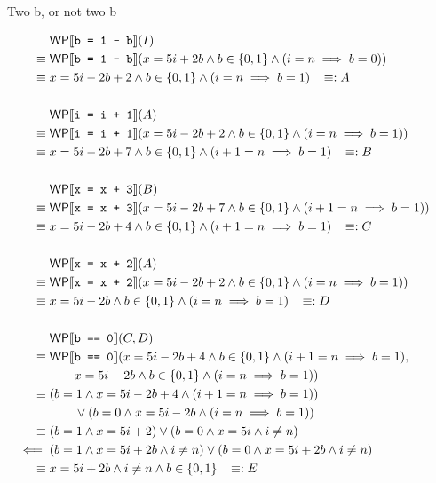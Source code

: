 \documentclass[
  english
]{tumteaching}
\begin{document}
\begin{assignment}[L]{Two b, or not two b}
\begin{solution}
		\begin{align*}
			&\;\WP{b = 1 - b}(I)\\
			\equiv&\;\WP{b = 1 - b}(x = 5i + 2b \land b \in \{ 0, 1 \} \land (i = n \implies b = 0))\\
			\equiv&\;x = 5i -2b + 2 \land b \in \{ 0, 1 \} \land (i = n \implies b = 1) \;\;\; \equivdef A\\
			&&\\
			&\;\WP{i = i + 1}(A)\\
			\equiv&\;\WP{i = i + 1}(x = 5i - 2b + 2 \land b \in \{ 0, 1 \} \land (i = n \implies b = 1))\\
			\equiv&\;x = 5i -2b + 7 \land b \in \{ 0, 1 \} \land (i + 1 = n \implies b = 1) \;\;\; \equivdef B\\
			&&\\
			&\;\WP{x = x + 3}(B)\\
			\equiv&\;\WP{x = x + 3}(x = 5i - 2b + 7 \land b \in \{ 0, 1 \} \land (i + 1 = n \implies b = 1))\\
			\equiv&\;x = 5i - 2b + 4 \land b \in \{ 0, 1 \} \land (i + 1 = n \implies b = 1) \;\;\; \equivdef C\\
			&&\\
			&\;\WP{x = x + 2}(A)\\
			\equiv&\;\WP{x = x + 2}(x = 5i - 2b + 2 \land b \in \{ 0, 1 \} \land (i = n \implies b = 1))\\
			\equiv&\;x = 5i - 2b \land b \in \{ 0, 1 \} \land (i = n \implies b = 1)\;\;\; \equivdef D\\
			&&\\
			&\;\WP{b == 0}(C, D)\\
			\equiv&\;\WP{b == 0}(x = 5i - 2b + 4 \land b \in \{ 0, 1 \} \land (i + 1 = n \implies b = 1), \\
			&\;\qquad x = 5i - 2b \land b \in \{ 0, 1 \} \land (i = n \implies b = 1))\\
			\equiv&\;(b = 1 \land x = 5i - 2b + 4 \land (i + 1 = n \implies b = 1))\\
			&\;\qquad \lor (b = 0 \land x = 5i - 2b \land (i = n \implies b = 1))\\
			\equiv&\;(b = 1 \land x = 5i + 2) \lor (b = 0 \land x = 5i \land i \neq n)\\
			\impliedby&\;(b = 1 \land x = 5i +2b \land i \neq n) \lor (b = 0 \land x = 5i + 2b \land i \neq n)\\
			\equiv&\;x = 5i + 2b \land i \neq n \land b \in \{ 0, 1 \} \;\;\; \equivdef E\\
			&&\\

\end{align*}
\end{solution}
\end{assignment}
\end{document}
